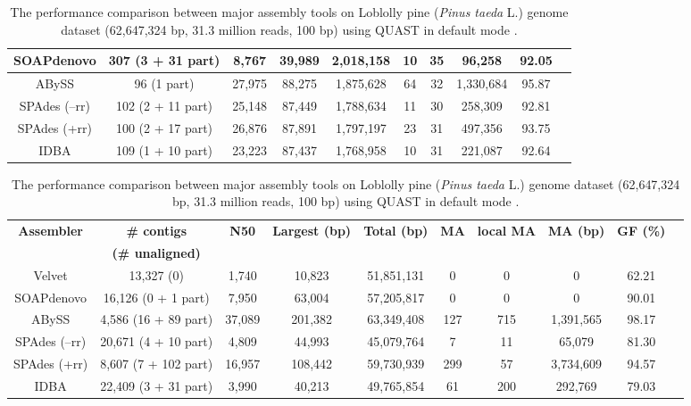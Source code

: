 \documentclass[doctor]{thesis}
\begin{document}
\begin{table}[h!]
\begin{center}
\begin{tabular}{|c|c|c|c|c|c|c|c|c|c}
SOAPdenovo 				& 307 (3 + 31 part)		& 8,767		& 39,989				& 2,018,158 		& 10			& 35			& 96,258			& 92.05				\\ \hline
ABySS					& 96 (1 part)  			& 27,975  		& 88,275				& 1,875,628		& 64  		& 32			& 1,330,684		& 95.87  			 	 \\ \hline
SPAdes (--rr)				& 102 (2 + 11 part) 		&  25,148		& 87,449				& 1,788,634		& 11 			& 30			& 258,309			& 92.81			 	 \\ \hline
SPAdes (+rr)				& 100 (2 + 17 part) 		&  26,876		& 87,891				& 1,797,197 		& 23 			& 31			& 497,356			& 93.75			 	 \\ \hline
IDBA						& 109 (1 + 10 part)		& 23,223 		& 87,437 				& 1,768,958		& 10			& 31			& 221,087			& 92.64  				 \\ \hline
\end{tabular}
\label{tab:ging}
\vspace{10mm}
\caption{\footnotesize{The performance comparison between major assembly tools on Loblolly pine ({\em Pinus taeda} L.) genome dataset (62,647,324 bp, 31.3 million reads, 100 bp) using QUAST in default mode \cite{quast}.}}
\label{tab:pine}
\begin{tabular}{|c|c|c|c|c|c|c|c|c|c}
\hline
\textbf{Assembler} 			&{\bf \# contigs }		& \textbf{N50}	& \textbf{Largest (bp)}	& \textbf{Total (bp) }	&\textbf{MA}	&\textbf{local MA}	& {\bf MA (bp)} 		& \textbf{GF (\%)} \\ 
 						&{\bf (\# unaligned) }		& 			& 					& 				&			& 			& 				& \\ \hline
Velvet					& 13,327 (0)			& 1,740		& 10,823				& 51,851,131 		& 0			& 0			& 0				& 62.21			  \\ \hline
SOAPdenovo 				& 16,126 (0 + 1 part)		& 7,950		& 63,004				& 57,205,817 		& 0			& 0			& 0				& 90.01				\\ \hline
ABySS					& 4,586 (16 + 89 part)  	& 37,089  		& 201,382				& 63,349,408		& 127  		& 715		& 1,391,565		& 98.17  			 	 \\ \hline
SPAdes (--rr)				& 20,671 (4 + 10 part) 	& 4,809		& 44,993				& 45,079,764		& 7 			& 11			& 65,079			& 81.30			 	 \\ \hline
SPAdes (+rr)				& 8,607 (7 + 102 part) 	& 16,957		& 108,442				& 59,730,939 		& 299 		& 57			& 3,734,609		& 94.57			 	 \\ \hline
IDBA						& 22,409 (3 + 31 part)	& 3,990 		& 40,213				& 49,765,854		& 61			& 200		& 292,769			& 79.03  				 \\ \hline
\end{tabular}
\end{center}
\end{table}
\end{document}
